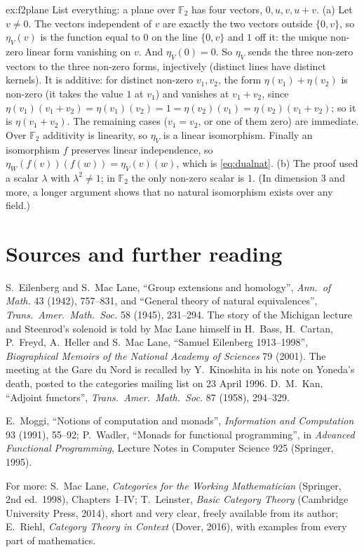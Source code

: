 \begin{solution}{ex:f2plane}
\idea List everything: a plane over $\mathbb F_2$ has four vectors, $0,u,v,u+v$.
\writeup (a) Let $v\ne0$. The vectors independent of $v$ are exactly the two vectors outside $\{0,v\}$, so $\eta_V(v)$ is the function equal to $0$ on the line $\{0,v\}$ and $1$ off it: the unique non-zero linear form vanishing on $v$.
And $\eta_V(0)=0$. So $\eta_V$ sends the three non-zero vectors to the three non-zero forms, injectively (distinct lines have distinct kernels). It is additive: for distinct non-zero $v_1,v_2$, the form $\eta(v_1)+\eta(v_2)$ is non-zero (it takes the value
$1$ at $v_1$) and vanishes at $v_1+v_2$, since $\eta(v_1)(v_1+v_2)=\eta(v_1)(v_2)=1=\eta(v_2)(v_1)=\eta(v_2)(v_1+v_2)$; so it is $\eta(v_1+v_2)$. The remaining cases ($v_1=v_2$, or one of them zero) are immediate. Over $\mathbb F_2$
additivity is linearity, so $\eta_V$ is a linear isomorphism. Finally an isomorphism $f$ preserves linear independence, so $\eta_W(f(v))(f(w))=\eta_V(v)(w)$, which is \eqref{eq:dualnat}.
(b) The proof used a scalar $\lambda$ with $\lambda^2\ne1$; in $\mathbb F_2$ the only non-zero scalar is $1$. (In dimension $3$ and more, a longer argument shows that no natural isomorphism exists over any field.)
\end{solution}

\section*{Sources and further reading}

S.~Eilenberg and S.~Mac Lane, ``Group extensions and homology'', \emph{Ann.\ of Math.} 43 (1942), 757--831, and ``General theory of natural equivalences'', \emph{Trans.\ Amer.\ Math.\ Soc.} 58 (1945), 231--294. The story of the
Michigan lecture and Steenrod's solenoid is told by Mac Lane himself in H.~Bass, H.~Cartan, P.~Freyd, A.~Heller and S.~Mac Lane, ``Samuel Eilenberg 1913--1998'', \emph{Biographical Memoirs of the National Academy of
Sciences} 79 (2001). The meeting at the Gare du Nord is recalled by Y.~Kinoshita in his note on Yoneda's death, posted to the categories mailing list on 23 April 1996. D.~M.~Kan, ``Adjoint functors'', \emph{Trans.\ Amer.\ Math.\ Soc.} 87 (1958),
294--329.

E.~Moggi, ``Notions of computation and monads'', \emph{Information and Computation} 93 (1991), 55--92; P.~Wadler, ``Monads for functional programming'', in \emph{Advanced Functional Programming}, Lecture Notes in Computer
Science 925 (Springer, 1995).

For more: S.~Mac Lane, \emph{Categories for the Working Mathematician} (Springer, 2nd ed.\ 1998), Chapters~I--IV; T.~Leinster, \emph{Basic Category Theory} (Cambridge University Press, 2014), short and very clear, freely available
from its author; E.~Riehl, \emph{Category Theory in Context} (Dover, 2016), with examples from every part of mathematics.
